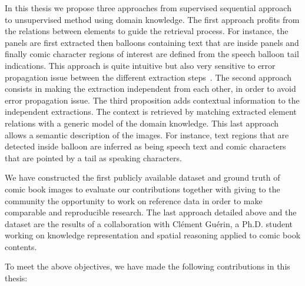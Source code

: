 In this thesis we propose three approaches from supervised sequential approach to unsupervised method using domain knowledge. 
The first approach profits from the relations between elements to guide the retrieval process.
For instance, the panels are first extracted then balloons containing text that are inside panels and finally comic character regions of interest are defined from the speech balloon tail indications.
This approach is quite intuitive but also very sensitive to error propagation issue between the different extraction steps~\cite{Arai11,Ho2012}.
The second approach consists in making the extraction independent from each other, in order to avoid error propagation issue.
The third proposition adds contextual information to the independent extractions.
The context is retrieved by matching extracted element relations with a generic model of the domain knowledge.
This last approach allows a semantic description of the images.
For instance, text regions that are detected inside balloon are inferred as being speech text and comic characters that are pointed by a tail as speaking characters.

We have constructed the first publicly available dataset and ground truth of comic book images to evaluate our contributions together with giving to the community the opportunity to work on reference data in order to make comparable and reproducible research.
The last approach detailed above and the dataset are the results of a collaboration with Cl{\'e}ment Gu{\'e}rin, a Ph.D. student working on knowledge representation and spatial reasoning applied to comic book contents.

To meet the above objectives, we have made the following contributions in this thesis:

